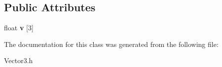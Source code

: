 \subsection*{Public Attributes}
\begin{DoxyCompactItemize}
\item 
\mbox{\label{class_vector3_a0bac7304ad137502e0477b0a5ae716de}} 
float {\bfseries v} \mbox{[}3\mbox{]}
\end{DoxyCompactItemize}


The documentation for this class was generated from the following file\+:\begin{DoxyCompactItemize}
\item 
Vector3.\+h\end{DoxyCompactItemize}
